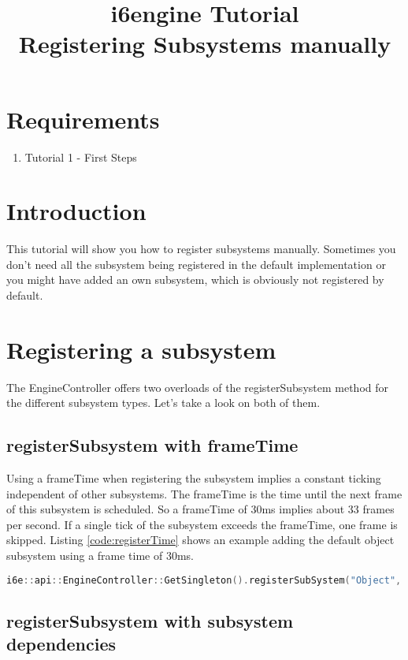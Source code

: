 \documentclass{article}
\title{i6engine Tutorial \\ Registering Subsystems manually}
\begin{document}
\section{Requirements}

\begin{enumerate}
\item Tutorial 1 - First Steps
\end{enumerate}

\section{Introduction}

This tutorial will show you how to register subsystems manually. Sometimes you don't need all the subsystem being registered in the default implementation or you might have added an own subsystem, which is obviously not registered by default.

\section{Registering a subsystem}

The EngineController offers two overloads of the registerSubsystem method for the different subsystem types. Let's take a look on both of them.

\subsection{registerSubsystem with frameTime}

Using a frameTime when registering the subsystem implies a constant ticking independent of other subsystems. The frameTime is the time until the next frame of this subsystem is scheduled. So a frameTime of 30ms implies about 33 frames per second. If a single tick of the subsystem exceeds the frameTime, one frame is skipped. Listing \ref{code:registerTime} shows an example adding the default object subsystem using a frame time of 30ms.

\begin{lstlisting}[language=C++, style=basic, caption={registering object subsystem}, label=code:registerTime]
i6e::api::EngineController::GetSingleton().registerSubSystem("Object", new i6e::modules::ObjectController(), 30000);
\end{lstlisting}

\subsection{registerSubsystem with subsystem dependencies}
\end{document}
